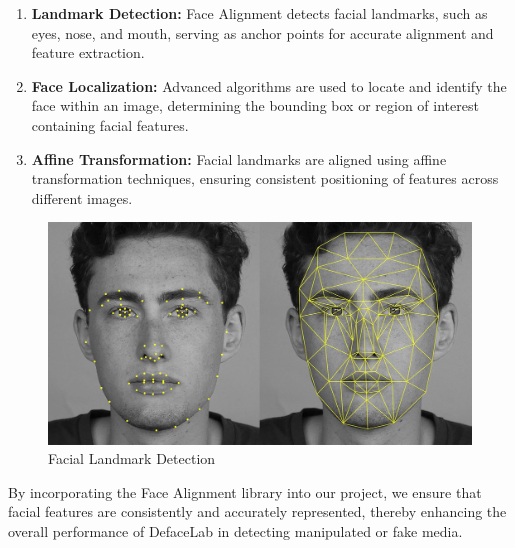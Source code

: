 \begin{enumerate}
    \item \textbf{Landmark Detection:} Face Alignment detects facial landmarks, such as eyes, nose, and mouth, serving as anchor points for accurate alignment and feature extraction.

    \item \textbf{Face Localization:} Advanced algorithms are used to locate and identify the face within an image, determining the bounding box or region of interest containing facial features.

    \item \textbf{Affine Transformation:} Facial landmarks are aligned using affine transformation techniques, ensuring consistent positioning of features across different images.


\end{enumerate}

\begin{figure}[htbp]
    \centering
    \includegraphics[width=5in]{img/facial feature.jpg}
    \caption{Facial Landmark Detection}
\end{figure}

\noindent By incorporating the Face Alignment library into our project, we ensure that facial features are consistently and accurately represented, thereby enhancing the overall performance of DefaceLab in detecting manipulated or fake media.

\newpage